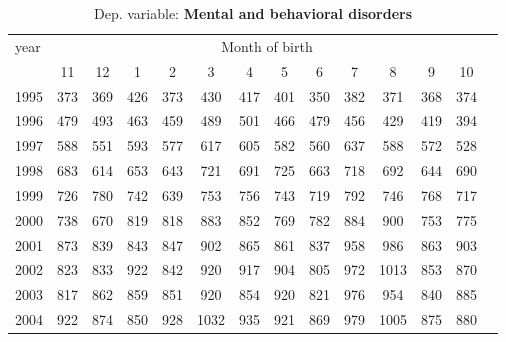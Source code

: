  \begin{table}[H] \begin{threeparttable} \centering \caption{Dep. variable: \textbf{Mental and behavioral disorders}} {\def\sym#1{\ifmmode^{#1}\else\(^{#1}\)\fi} \begin{tabular}{l*{13}{c}} \toprule year & \multicolumn{12}{c}{Month of birth} \\ \cmidrule(lr){2-13} 
            &          11&          12&           1&           2&           3&           4&           5&           6&           7&           8&           9&          10\\
1995        &         373&         369&         426&         373&         430&         417&         401&         350&         382&         371&         368&         374\\
1996        &         479&         493&         463&         459&         489&         501&         466&         479&         456&         429&         419&         394\\
1997        &         588&         551&         593&         577&         617&         605&         582&         560&         637&         588&         572&         528\\
1998        &         683&         614&         653&         643&         721&         691&         725&         663&         718&         692&         644&         690\\
1999        &         726&         780&         742&         639&         753&         756&         743&         719&         792&         746&         768&         717\\
2000        &         738&         670&         819&         818&         883&         852&         769&         782&         884&         900&         753&         775\\
2001        &         873&         839&         843&         847&         902&         865&         861&         837&         958&         986&         863&         903\\
2002        &         823&         833&         922&         842&         920&         917&         904&         805&         972&        1013&         853&         870\\
2003        &         817&         862&         859&         851&         920&         854&         920&         821&         976&         954&         840&         885\\
2004        &         922&         874&         850&         928&        1032&         935&         921&         869&         979&        1005&         875&         880\\

\end{tabular}}
\end{threeparttable}
\end{table}
